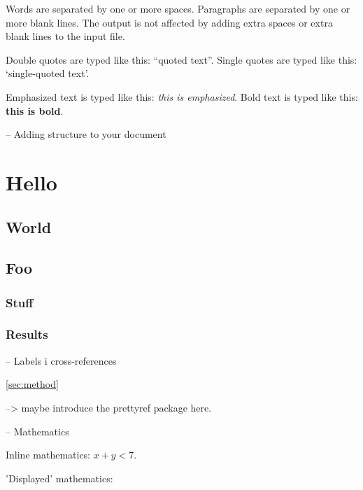 
Words are separated by one or more spaces.  Paragraphs are separated by
one or more blank lines.  The output is not affected by adding extra
spaces or extra blank lines to the input file.

Double quotes are typed like this: ``quoted text''.
Single quotes are typed like this: `single-quoted text'.

Emphasized text is typed like this: \emph{this is emphasized}.
Bold       text is typed like this: \textbf{this is bold}.

-- Adding structure to your document

\section{Hello}

\subsection{World}

\subsection{Foo}

\subsubsection*{Stuff} %

\subsubsection*{Results}

-- Labels i cross-references

\label{sec:intro}
\label{sec:method}
\ref{sec:method}

--> maybe introduce the prettyref package here.

-- Mathematics

Inline mathematics: $x + y < 7$.

'Displayed' mathematics:
\begin{equation}
\end{equation}

\begin{equation*}
\end{equation*}

\begin{align}
\end{align}

